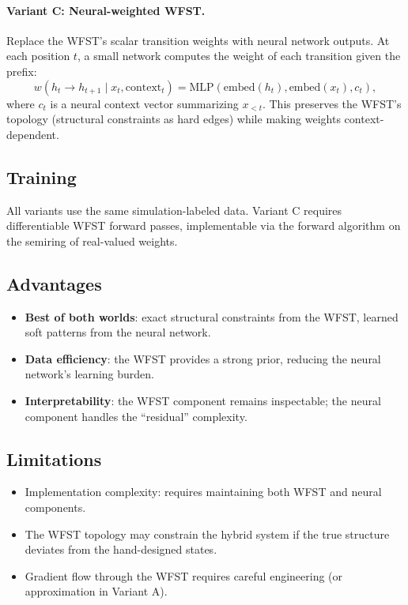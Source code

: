 \documentclass{article}
\begin{document}
\paragraph{Variant C: Neural-weighted WFST.}
Replace the WFST's scalar transition weights with neural network outputs.
At each position $t$, a small network computes the weight of each
transition given the prefix:
\begin{equation}
  w(h_t \to h_{t+1} \mid x_t, \text{context}_t)
    = \text{MLP}(\text{embed}(h_t), \text{embed}(x_t), c_t),
\end{equation}
where $c_t$ is a neural context vector summarizing $x_{<t}$.
This preserves the WFST's topology (structural constraints as hard
edges) while making weights context-dependent.

\subsection{Training}

All variants use the same simulation-labeled data.  Variant C requires
differentiable WFST forward passes, implementable via the forward
algorithm on the semiring of real-valued weights.

\subsection{Advantages}

\begin{itemize}
  \item \textbf{Best of both worlds}: exact structural constraints from
        the WFST, learned soft patterns from the neural network.
  \item \textbf{Data efficiency}: the WFST provides a strong prior,
        reducing the neural network's learning burden.
  \item \textbf{Interpretability}: the WFST component remains inspectable;
        the neural component handles the ``residual'' complexity.
\end{itemize}

\subsection{Limitations}

\begin{itemize}
  \item Implementation complexity: requires maintaining both WFST and
        neural components.
  \item The WFST topology may constrain the hybrid system if the true
        structure deviates from the hand-designed states.
  \item Gradient flow through the WFST requires careful engineering
        (or approximation in Variant A).
\end{itemize}
\end{document}
